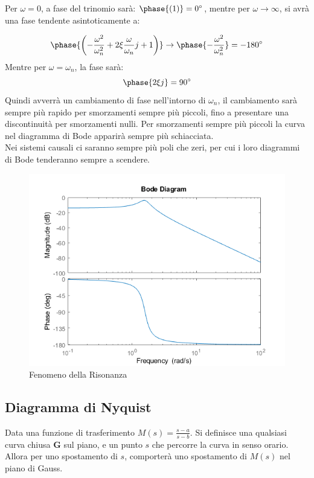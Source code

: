\documentclass{article}
\numberwithin{equation}{subsection}
\begin{document}
Per $\omega=0$, a fase del trinomio sarà: $\phase{(1)}=0^{\circ}$, mentre per $\omega\to\infty$, si avrà una fase tendente asintoticamente a: 

\begin{equation}
    \phase{\left(-\displaystyle\frac{\omega^2}{\omega_n^2}+2\xi\frac{\omega}{\omega_n}j+1\right)}\to\phase{-\displaystyle\frac{\omega^2}{\omega_n^2}}=-180^{\circ}
\end{equation}
Mentre per $\omega=\omega_n$, la fase sarà: 
\begin{equation}
    \phase{2\xi j}=90^{\circ}
\end{equation}
Quindi avverrà un cambiamento di fase nell'intorno di $\omega_n$, il cambiamento sarà sempre più rapido per smorzamenti sempre più piccoli, fino a presentare una 
discontinuità per smorzamenti nulli. Per smorzamenti sempre più piccoli la curva nel diagramma di Bode apparirà sempre più schiacciata. \\
Nei sistemi causali ci saranno sempre più poli che zeri, per cui i loro diagrammi di Bode tenderanno sempre a scendere. 

\begin{figure}
    \includegraphics{BodeRisonanza}
    \caption{Fenomeno della Risonanza}
\end{figure}

\subsection{Diagramma di Nyquist}
Data una funzione di trasferimento $M(s)=\displaystyle\frac{s-a}{s-b}$. Si definisce una qualsiasi curva chiusa $\mathbf{G}$ sul piano, e un punto $s$ che percorre la curva in senso 
orario. Allora per uno spostamento di $s$, comporterà uno spostamento di $M(s)$ nel piano di Gauss. 
\end{document}
